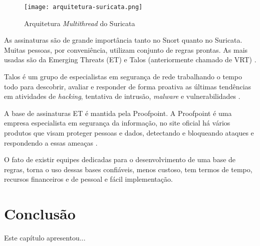 \begin{figure}[htb]
  \centering
  \caption{Arquitetura \textit{Multithread} do Suricata} \label{fig_arquitetura-suricata}
  \texttt{[image: arquitetura-suricata.png]} 
\end{figure}

As assinaturas são de grande importância tanto no Snort quanto no Suricata. Muitas pessoas, por conveniência, utilizam conjunto de regras prontas. As mais usadas são da Emerging Threats (ET) e Talos (anteriormente chamado de VRT) \cite{suricata:rule}. 

Talos é um grupo de especialistas em segurança de rede trabalhando o tempo todo para descobrir, avaliar e responder de forma proativa as últimas tendências em atividades de \textit{hacking}, tentativa de intrusão, \textit{malware} e vulnerabilidades \cite{snort:talos}. 

A base de assinaturas ET é mantida pela Proofpoint. A Proofpoint é uma empresa especialista em segurança da informação, no site oficial há vários produtos que visam proteger pessoas e dados, detectando e bloqueando ataques e respondendo a essas ameaças \cite{et:proofpoint}.

O fato de existir equipes dedicadas para o desenvolvimento de uma base de regras, torna o uso dessas bases confiáveis, menos custoso, tem termos de tempo, recursos financeiros e de pessoal e fácil implementação. 

\section{Conclusão} \label{sec:idps-conclusao}
Este capítulo apresentou...
